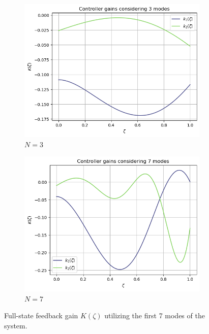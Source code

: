 \begin{figure}[!htbp]
    \centering
    \begin{subfigure}[b]{0.45\textwidth}
        \centering
        \includegraphics[width=\textwidth]{Figures/k_3.png}
        \caption{$N = 3$}
        \label{fig:k_3}
    \end{subfigure}
    \hfill
    \begin{subfigure}[b]{0.45\textwidth}
        \centering
        \includegraphics[width=\textwidth]{Figures/k_7.png}
        \caption{$N = 7$}
        \label{fig:k_7}
    \end{subfigure}
    \caption{Full-state feedback gain $K(\zeta)$ utilizing the first 7 modes of the system.}
    \label{fig:k_modes}
\end{figure}

